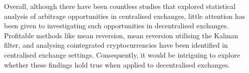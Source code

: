 \noindent Overall, although there have been countless studies that explored statistical analysis of arbitrage opportunities in centralised exchanges, little attention has been given to investigating such opportunities in decentralised exchanges. Profitable methods like mean reversion, mean reversion utilising the Kalman filter, and analysing cointegrated cryptocurrencies have been identified in centralised exchange settings. Consequently, it would be intriguing to explore whether these findings hold true when applied to decentralised exchanges.
